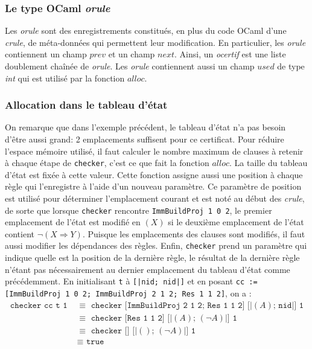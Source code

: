 \documentclass[11pt]{article}
\begin{document}
\subsubsection{Le type OCaml \textit{orule}}

 Les \textit{orule} sont des enregistrements constitués, en plus du code OCaml d'une \textit{crule}, de méta-données qui permettent leur modification. En particulier, les \textit{orule} contiennent un champ $prev$ et un champ $next$. Ainsi, un \textit{ocertif} est une liste doublement chaînée de \textit{orule}. Les \textit{orule} contiennent aussi un champ $used$ de type \textit{int} qui est utilisé par la fonction $alloc$.


\subsubsection{Allocation dans le tableau d'état} \label{alloc}

On remarque que dans l'exemple précédent, le tableau d'état n'a pas besoin d'être aussi grand: 2 emplacements suffisent pour ce certificat. Pour réduire l'espace mémoire utilisé, il faut calculer le nombre maximum de clauses à retenir à chaque étape de \texttt{checker}, c'est ce que fait la fonction $alloc$. La taille du tableau d'état est fixée à cette valeur. Cette fonction assigne aussi une position à chaque règle qui l'enregistre à l'aide d'un nouveau paramètre. Ce paramètre de position est utilisé pour déterminer l'emplacement courant et est noté au début des \textit{crule}, de sorte que lorsque \texttt{checker} rencontre \texttt{ImmBuildProj 1 0 2}, le premier emplacement de l'état est modifié en $(X)$ si le deuxième emplacement de l'état contient $\neg(X \Rightarrow Y)$. Puisque les emplacements des clauses sont modifiés, il faut aussi modifier les dépendances des règles. Enfin, \texttt{checker} prend un paramètre qui indique quelle est la position de la dernière règle, le résultat de la dernière règle n'étant pas nécessairement au dernier emplacement du tableau d'état comme précédemment. En initialisant \texttt{t} à \texttt{[|nid; nid|]} et en posant \texttt{cc := [ImmBuildProj 1 0 2; ImmBuildProj 2 1 2; Res 1 1 2]}, on a :
\begin{align*}
  \texttt{checker cc t 1} \,\,&\equiv \,\, \texttt{checker [ImmBuildProj 2 1 2; Res 1 1 2] [|}(A)\texttt{; nid|] 1} \\
    &\equiv \,\,\texttt{checker [Res 1 1 2] [|}(A)\texttt{; }(\neg A)\texttt{|] 1} \\
    &\equiv \,\,\texttt{checker [] [|}()\texttt{; }(\neg A)\texttt{|] 1} \\
    &\equiv \,\,\texttt{true}
\end{align*}
\end{document}
